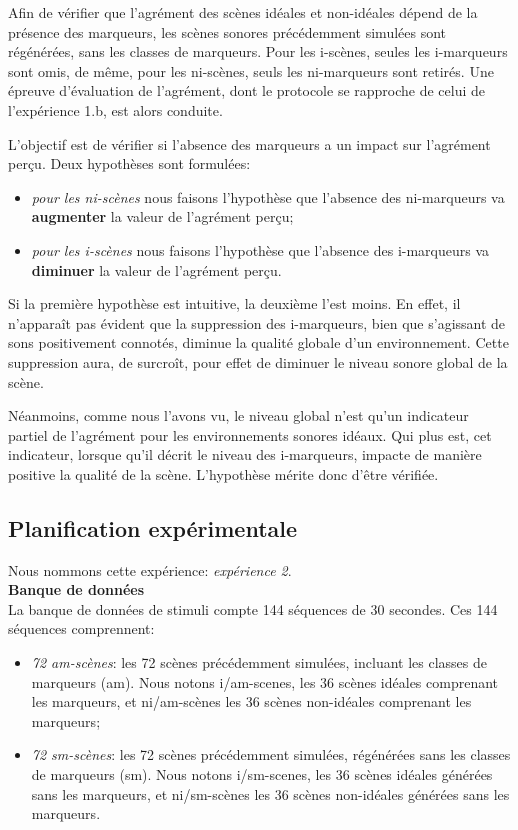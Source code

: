 Afin de vérifier que l'agrément des scènes idéales et non-idéales dépend de la présence des marqueurs, les scènes sonores précédemment simulées sont régénérées, sans les classes de marqueurs. Pour les i-scènes, seules les i-marqueurs sont omis, de même, pour les ni-scènes, seuls les ni-marqueurs sont retirés. Une épreuve d'évaluation de l'agrément, dont le protocole se rapproche de celui de l'expérience 1.b, est alors conduite.

L'objectif est de vérifier si l'absence des marqueurs a un impact sur l'agrément perçu. Deux hypothèses sont formulées:

\begin{itemize}
\item \emph{pour les ni-scènes} nous faisons l'hypothèse que l'absence des ni-marqueurs va \textbf{augmenter} la valeur de l'agrément perçu;
\item \emph{pour les i-scènes} nous faisons l'hypothèse que l'absence des i-marqueurs va \textbf{diminuer} la valeur de l'agrément perçu.
\end{itemize}

Si la première hypothèse est intuitive, la deuxième l'est moins. En effet, il n’apparaît pas évident que la suppression des i-marqueurs, bien que s'agissant de sons positivement connotés, diminue la qualité globale d'un environnement. Cette suppression aura, de surcroît, pour effet de diminuer le niveau sonore global de la scène. 

Néanmoins, comme nous l'avons vu, le niveau global n'est qu'un indicateur partiel de l'agrément pour les environnements sonores idéaux. Qui plus est, cet indicateur, lorsque qu'il décrit le niveau des i-marqueurs, impacte de manière positive la qualité de la scène. L'hypothèse mérite donc d'être vérifiée.

\subsection{Planification expérimentale}

Nous nommons cette expérience: \emph{expérience 2}. \\

\textbf{Banque de données} \\

La banque de données de stimuli compte 144 séquences de 30 secondes. Ces 144 séquences comprennent:

\begin{itemize}
\item \emph{72 am-scènes}: les 72 scènes précédemment simulées, incluant les classes de marqueurs (am). Nous notons i/am-scenes, les 36 scènes idéales comprenant les marqueurs, et ni/am-scènes les 36 scènes non-idéales comprenant les marqueurs;
\item \emph{72 sm-scènes}: les 72 scènes précédemment simulées, régénérées sans les classes de marqueurs (sm). Nous notons i/sm-scenes, les 36 scènes idéales générées sans les marqueurs, et ni/sm-scènes les 36 scènes non-idéales générées sans les marqueurs.
\end{itemize}


